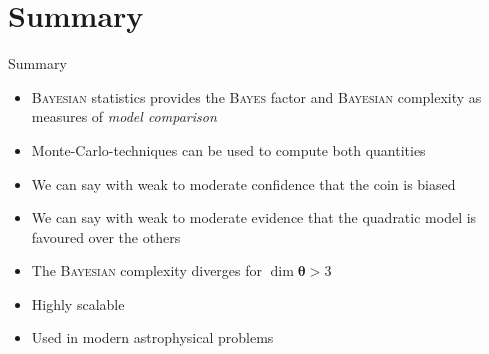 \documentclass[11pt,aspectratio=1610,dvipsnames]{beamer}
\newcommand{\btheta}{\boldsymbol{\theta}}
\begin{document}
\section{Summary}
\begin{frame}{Summary}
	\begin{minipage}{0.49\linewidth}
			\begin{tcolorbox}[colback=blue!5,colframe=gray!15!black,title=Theory and methods, width=\linewidth]
			\begin{itemize}
				\item \textsc{Bayesian} statistics provides the \textsc{Bayes} factor and \textsc{Bayesian} complexity as measures of \emph{model comparison}
				\item Monte-Carlo-techniques can be used to compute both quantities
				\vspace{0.5cm}
			\end{itemize}
		\end{tcolorbox}
	\end{minipage}
\hfill
\begin{minipage}{0.49\linewidth}
	\begin{tcolorbox}[colback=green!5,colframe=gray!15!black,title=Exampless, width=\linewidth]
		\begin{itemize}
			\item We can say with weak to moderate confidence that the coin is biased
			\item We can say with weak to moderate evidence that the quadratic model is favoured over the others
			\item The \textsc{Bayesian} complexity diverges for $\dim{\btheta}>3$ 
		\end{itemize}
	\end{tcolorbox}
\end{minipage}

\begin{minipage}{0.84\linewidth}
		\begin{tcolorbox}[colback=red!5,colframe=gray!15!black,title=Outlook, width=\linewidth]
		
			\begin{multicols}{2}
				\begin{itemize}
					\item Highly scalable
				\end{itemize}
			\columnbreak
			\begin{itemize}
				\item Used in modern astrophysical problems
			\end{itemize}	
		

\end{multicols}
\end{tcolorbox}
\end{minipage}
\end{frame}
\end{document}
